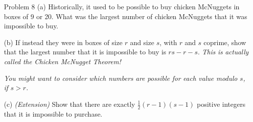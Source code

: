 \documentclass{article}
\begin{document}
\begin{problem}{Problem 8}
(a) Historically, it used to be possible to buy chicken McNuggets in boxes
of 9 or 20. What was the largest number of chicken McNuggets that it was
impossible to buy. \vspace{0.2cm}

(b) If instead they were in boxes of size $r$ and size $s$, with
$r$ and $s$ coprime, show that the largest number that it is impossible
to buy is $rs - r - s$. \textit{This is actually called the Chicken
McNugget Theorem!}
\vspace{0.2cm}

\textit{You might want to consider which numbers are possible for each
value modulo $s$, if $s > r$.}
\vspace{0.2cm}

(c) \textit{(Extension)} Show that there are exactly
$\frac12 (r-1)(s-1)$ positive integers that it is impossible to purchase.
\end{problem}
\end{document}
